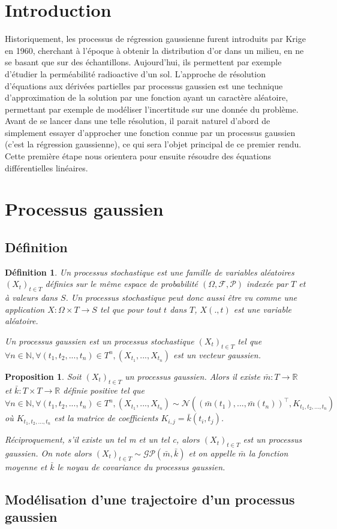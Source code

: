 \documentclass[a4paper,12pt]{article}
\newtheorem{definition}{Définition}
\newtheorem{proposition}{Proposition}
\begin{document}
\tableofcontents

\section{Introduction}

Historiquement, les processus de régression gaussienne furent introduits par Krige en 1960,
 cherchant à l’époque à obtenir la distribution d’or dans un milieu, en ne se basant que 
 sur des échantillons. Aujourd’hui, ils permettent par exemple d’étudier la perméabilité 
 radioactive d’un sol. L'approche de résolution d'équations aux dérivées partielles par 
 processus gaussien est une technique d'approximation de la solution par une fonction ayant
 un caractère aléatoire, permettant par exemple de modéliser l'incertitude sur une donnée du problème. 
 Avant de se lancer dans une telle résolution, il parait naturel d'abord de simplement essayer 
 d'approcher une fonction connue par un processus gaussien (c'est la régression gaussienne), 
 ce qui sera l'objet principal de ce premier rendu. Cette première étape nous orientera pour 
 ensuite résoudre des équations différentielles linéaires.

\section{Processus gaussien}

\subsection{Définition}

\begin{definition}
    Un processus stochastique est une famille de variables aléatoires $({X_t})_{t \in T}$ 
    définies sur le même espace de probabilité $(\Omega,\mathcal{F},\mathcal{P})$ indexée par 
    $T$ et à valeurs dans $S$. Un processus stochastique peut donc aussi être vu comme une application 
    $X:\Omega \times T \to S$ tel que 
    pour tout $t$ dans $T$, $X( . ,t)$ est une variable aléatoire.

    Un processus gaussien est un processus stochastique $({X_t})_{t \in T}$ tel que 
    $\forall n \in \mathbb{N}, \forall (t_1,t_2,...,t_n) \in T^{n}, (X_{t_1},...,X_{t_n})$
     est un vecteur gaussien.
\end{definition}

\begin{proposition}
    Soit $({X_t})_{t \in T}$ un processus gaussien. Alors il existe $\bar{m}:T \to \mathbb{R}$ et
     $\bar{k}:T \times T \to \mathbb{R}$ définie positive tel que $\forall n \in \mathbb{N},
      \forall (t_1,t_2,...,t_n) \in T^{n}, (X_{t_1},...,X_{t_n}) 
      \sim \mathcal{N}( (\bar{m}(t_1) , ... , \bar{m}(t_n))^\top , K_{t_1,t_2,...,t_n} )$ 
      où $K_{t_1,t_2,...,t_n}$ est la matrice de coefficients $K_{i,j}=\bar{k}(t_i,t_j)$.
    
    Réciproquement, s'il existe un tel m et un tel c, alors $({X_t})_{t \in T}$ est un processus gaussien. On note alors $({X_t})_{t \in T} \sim \mathcal{GP}(\bar{m},\bar{k})$ et on appelle $\bar{m}$ la fonction moyenne et $\bar{k}$ le noyau de covariance du processus gaussien.
\end{proposition}

\subsection{Modélisation d'une trajectoire d'un processus gaussien}
\end{document}

